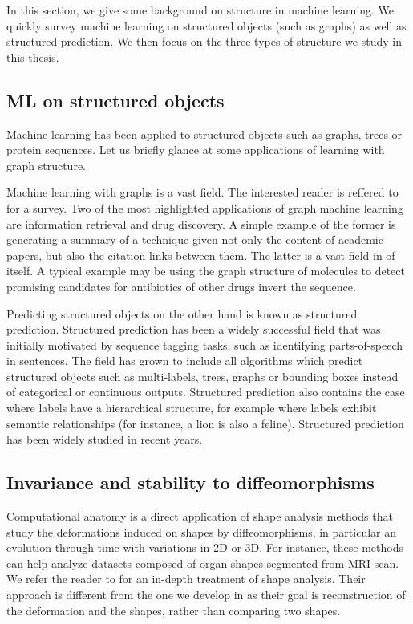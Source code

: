 In this section, we give some background on structure in machine learning. We quickly survey machine learning on structured objects (such as graphs) as well as structured prediction. We then focus on the three types of structure we study in this thesis.

\subsection{ML on structured objects}

Machine learning has been applied to structured objects such as graphs, trees or protein sequences. Let us briefly glance at some applications of learning with graph structure.

Machine learning with graphs is a vast field. The interested reader is reffered to \cite{FengXiaGraphSurvey} for a survey. Two of the most highlighted applications of graph machine learning are information retrieval and drug discovery. A simple example of the former is generating a summary of a technique given not only the content of academic papers, but also the citation links between them. The latter is a vast field in of itself. A typical example may be using the graph structure of molecules to detect promising candidates for antibiotics of other drugs invert the sequence\cite{stokes-antibiotics}.

Predicting structured objects on the other hand is known as structured prediction. Structured prediction has been a widely successful field that was initially motivated by sequence tagging tasks, such as identifying parts-of-speech in sentences. The field has grown to include all algorithms which predict structured objects such as multi-labels, trees, graphs or bounding boxes instead of categorical or continuous outputs. Structured prediction also contains the case where labels have a hierarchical structure, for example where labels exhibit semantic relationships (for instance, a lion is also a feline). Structured prediction has been widely studied in recent years\cite{rudi-structures,nowak-vila}.

\subsection{Invariance and stability to diffeomorphisms}

Computational anatomy is a direct application of shape analysis methods that study the deformations induced on shapes by diffeomorphisms, in particular an evolution through time with variations in 2D or 3D. For instance, these methods can help analyze datasets composed of organ shapes segmented from MRI scan. We refer the reader to \cite{younes} for an in-depth treatment of shape analysis. Their approach is different from the one we develop in \cite{ch:diffy} as their goal is reconstruction of the deformation and the shapes, rather than comparing two shapes.

